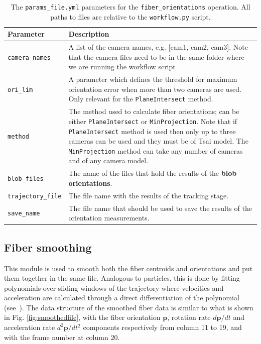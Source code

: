\documentclass[10pt,a4paper]{article}
\begin{document}
%
\begin{table}[!ht]
	\centering
	\caption{The \texttt{params\_file.yml} parameters for the \texttt{fiber\_orientations} operation. All paths to files are relative to the \texttt{workflow.py} script. \label{tab:fibers}}
	\begin{tabular}{l m{12cm}}
		\hline
		Parameter & Description\\[.2cm]
		\hline
		\texttt{camera\_names} & A list of the camera names, e.g. [cam1, cam2, cam3]. Note that the camera files need to be in the same folder where we are running the workflow script\\[.2cm]
		\texttt{ori\_lim} & A parameter which defines the threshold for maximum orientation error when more than two cameras are used. Only relevant for the \texttt{PlaneIntersect} method.\\[.2cm]
		\texttt{method} & The method used to calculate fiber orientations; can be either \texttt{PlaneIntersect} or \texttt{MinProjection}. Note that if \texttt{PlaneIntersect} method is used then only up to three cameras can be used and they must be of Tsai model. The \texttt{MinProjection} method can take any number of cameras and of any camera model. \\[.2cm]
		\texttt{blob\_files} & The name of the files that hold the results of the \textbf{blob orientations}. \\[.2cm]
		\texttt{trajectory\_file} & The file name with the results of the tracking stage. \\[.2cm]
		\texttt{save\_name} & The file name that should be used to save the results of the orientation measurements. \\[.2cm]
		\hline
	\end{tabular}
\end{table}


\subsection{Fiber smoothing} \label{sec:fibers_smoothing}

This module is used to smooth both the fiber centroids and orientations and put them together in the same file. Analogous to particles, this is done by fitting polynomials over sliding windows of the trajectory where velocities and acceleration are calculated through a direct differentiation of the polynomial (see~\cite{Luthi2005}). The data structure of the smoothed fiber data is similar to what is shown in Fig. \ref{fig:smoothedfile}, with the fiber orientation $\textbf{p}$, rotation rate $d \textbf{p}/dt$ and acceleration rate $d^2 \textbf{p}/dt^2$ components respectively from column 11 to 19, and with the frame number at column 20.
\end{document}
